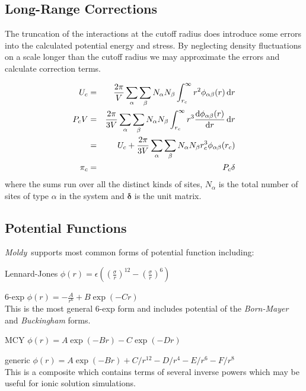 \documentclass[a4paper,twoside]{report}
\providecommand{\bm}[1]{\mathbf{#1}}
\newcommand{\moldy}{\emph{Moldy}}
\begin{document}
\subsection{Long-Range Corrections}
The truncation of the interactions at the cutoff radius does
introduce some errors into the calculated potential energy and stress.
By neglecting density fluctuations on a scale longer than the cutoff
radius we may approximate the errors and calculate correction 
terms\cite[pp 64-65]{allen:87}.

\begin{eqnarray}
U_c & = & \frac{2\pi}{V} \sum_\alpha \sum_\beta N_\alpha N_\beta 
               \int_{r_c}^\infty r^2 \phi_{\alpha\beta}(r) \, \Calcd r \\
P_c V & = & \frac{2\pi}{3 V} \sum_\alpha \sum_\beta N_\alpha N_\beta 
               \int_{r_c}^\infty r^3 
               \frac{\Calcd\phi_{\alpha\beta}(r)}{\Calcd r}
                \, \Calcd r \nonumber \\ 
           & = & U_c + \frac{2\pi}{3 V} \sum_\alpha \sum_\beta
           N_\alpha N_\beta r_c^3 \phi_{\alpha\beta}(r_c) \\
\bm{\pi}_c & = & P_c \bm{\delta}
\end{eqnarray}
where the sums run over all the distinct kinds of sites,
$N_\alpha$ is the total number of sites of type $\alpha$ in the system
and $\bm{\delta}$ is the unit matrix.


\subsection{Potential Functions}
\label{sec:potentials}
\moldy\ supports most common forms of potential function including:
\begin{list}{}{%
\setlength{\parsep}{0in} 
\setlength{\labelwidth}{1in}
\setlength{\labelsep}{0.25in}
\setlength{\leftmargin}{1.5in}
\renewcommand{\makelabel}[1]{\hspace{\labelsep}\emph{#1} \hfil}}
\item[Lennard-Jones] $\phi(r) = \epsilon((\frac{\sigma}{r})^{12} -
(\frac{\sigma}{r})^{6})$
\item[6-exp] $\phi(r) = -\frac{A}{r^{6}} +
B\exp(-Cr)$\\
This is the most general 6-exp form and
includes potential of the \emph{Born-Mayer} and \emph{Buckingham} forms.
\item[MCY] $\phi(r) = A \exp(-Br) - C \exp(-Dr)$
\item[generic]  $\phi(r) = A \exp(-Br) + C/r^{12} - D/r^4 -E/r^6 -F/r^8$\\
This is a composite which contains terms of several inverse powers
which may be useful for ionic solution simulations.
\end{list}
\end{document}
